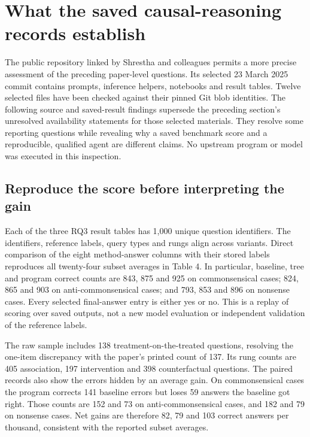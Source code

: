 \section{What the saved causal-reasoning records establish}
\label{exec21:prophetsrepo-scope}
The public repository linked by Shrestha and colleagues permits a more precise
assessment of the preceding paper-level questions. Its selected 23 March 2025
commit contains prompts, inference helpers, notebooks and result tables.
Twelve selected files have been checked against their pinned Git blob identities.
The following source and saved-result findings supersede the preceding section's
unresolved availability statements for those selected materials. They resolve
some reporting questions while revealing why a saved benchmark score and a
reproducible, qualified agent are different claims. No upstream program or
model was executed in this inspection.~\citep{exec21_prophets_repo}

\subsection{Reproduce the score before interpreting the gain}
\label{exec21:prophetsrepo-results}
Each of the three RQ3 result tables has 1,000 unique question identifiers. The
identifiers, reference labels, query types and rungs align across variants.
Direct comparison of the eight method-answer columns with their stored labels
reproduces all twenty-four subset averages in Table 4. In particular, baseline,
tree and program correct counts are 843, 875 and 925 on commonsensical cases;
824, 865 and 903 on anti-commonsensical cases; and 793, 853 and 896 on nonsense
cases. Every selected final-answer entry is either yes or no. This is a replay
of scoring over saved outputs, not a new model evaluation or independent
validation of the reference labels.~\citep{exec21_prophets_repo,exec21_prophets_repo_reference}

The raw sample includes 138 treatment-on-the-treated questions, resolving the
one-item discrepancy with the paper's printed count of 137. Its rung counts
are 405 association, 197 intervention and 398 counterfactual questions. The
paired records also show the errors hidden by an average gain. On commonsensical
cases the program corrects 141 baseline errors but loses 59 answers the baseline
got right. Those counts are 152 and 73 on anti-commonsensical cases, and 182 and
79 on nonsense cases. Net gains are therefore 82, 79 and 103 correct answers
per thousand, consistent with the reported subset averages.
\citep{exec21_prophets_repo_reference}

